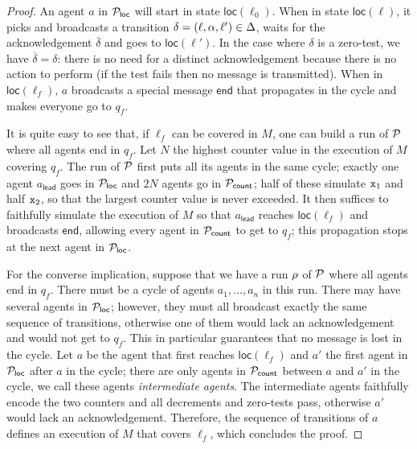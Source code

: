 \begin{proof}
	An agent $a$ in $\mathcal{P}_{\mathsf{loc}}$ will start in state $\mathsf{loc}(\ell_0)$. When in state $\mathsf{loc}(\ell)$, it picks and broadcasts a transition $\delta = (\ell, \alpha, \ell') \in \Delta$, waits for the acknowledgement $\overline{\delta}$ and goes to $\mathsf{loc}(\ell')$. In the case where $\delta$ is a zero-test, we have $\overline{\delta} = \delta$: there is no need for a distinct acknowledgement because there is no action to perform (if the test fails then no message is transmitted). When in $\mathsf{loc}(\ell_f)$, $a$ broadcasts a special message $\mathsf{end}$ that propagates in the cycle and makes everyone go to $q_f$. 
	
	It is quite easy to see that, if $\ell_f$ can be covered in $M$, one can build a run of $\mathcal{P}$ where all agents end in $q_f$. Let $N$ the highest counter value in the execution of $M$ covering $q_f$. The run of $\mathcal{P}$ first puts all its agents in the same cycle; exactly one agent $a_\mathsf{lead}$ goes in $\mathcal{P}_{\mathsf{loc}}$ and $2N$ agents go in $\mathcal{P}_{\mathsf{count}}$; half of these simulate $\mathtt{x}_1$ and half $\mathtt{x}_2$, so that the largest counter value is never exceeded. It then suffices to faithfully simulate the execution of $M$ so that $a_\mathsf{lead}$ reaches $\mathsf{loc}(\ell_f)$ and broadcasts $\mathsf{end}$, allowing every agent in $\mathcal{P}_{\mathsf{count}}$ to get to $q_f$; this propagation stops at the next agent in $\mathcal{P}_{\mathsf{loc}}$. 

	For the converse implication, suppose that we have a run $\rho$ of $\mathcal{P}$ where all agents end in $q_f$. There must be a cycle of agents $a_1, \dots, a_n$ in this run. There may have several agents in $\mathcal{P}_{\mathsf{loc}}$; however, they must all broadcast exactly the same sequence of transitions, otherwise one of them would lack an acknowledgement and would not get to $q_f$. This in particular guarantees that no message is lost in the cycle. Let $a$ be the agent that first reaches $\mathsf{loc}(\ell_f)$ and $a'$ the first agent in $\mathcal{P}_{\mathsf{loc}}$ after $a$ in the cycle; there are only agents in $\mathcal{P}_{\mathsf{count}}$ between $a$ and $a'$ in the cycle, we call these agents \emph{intermediate agents}. The intermediate agents faithfully encode the two counters and all decrements and zero-tests pass, otherwise $a'$ would lack an acknowledgement. Therefore, the sequence of transitions of $a$ defines an execution of $M$ that covers $\ell_f$, which concludes the proof.  
\end{proof}